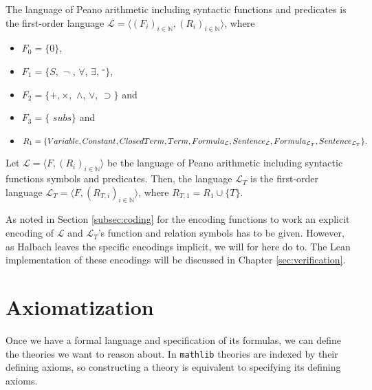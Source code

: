 \begin{definition}\label{def:l}
    The language of Peano arithmetic including syntactic functions and predicates is the first-order language $\mathcal{L} = \langle (F_i)_{i \in \mathbb{N}}, (R_i)_{i \in \mathbb{N}} \rangle$, where
    \begin{itemize}
        \item $F_0 = \{0\}$,
        \item $F_1 = \{S,$ \d{$\neg$} , \d{$\forall$}, \d{$\exists$}, ${^\circ}\}$,
        \item $F_2 = \{+,\times,$ \d{$\wedge$}, \d{$\vee$}, \d{$\supset$}$\}$ and
        \item $F_3 = \{$ \d{$subs$}$\}$ and
        \item $R_1 = \{Variable, Constant, ClosedTerm, Term, Formula_{\mathcal{L}}, Sentence_{\mathcal{L}}, \\ Formula_{\mathcal{L}_T}, Sentence_{\mathcal{L}_T}\}.$
    \end{itemize}
\end{definition} 

\begin{definition}\label{def:lt}
    Let $\mathcal{L} = \langle F, (R_i)_{i \in \mathbb{N}} \rangle$ be the language of Peano arithmetic including syntactic functions symbols and predicates. Then, the language $\mathcal{L}_T$ is the first-order language $\mathcal{L}_T = \langle F, (R_{T,i})_{i \in \mathbb{N}} \rangle$, where $R_{T,1} = R_1 \cup \{T\}$.
\end{definition}

As noted in Section \ref{subsec:coding} for the encoding functions to work an explicit encoding of $\mathcal{L}$ and $\mathcal{L}_T$'s function and relation symbols has to be given. However, as Halbach leaves the specific encodings implicit, we will for here do to. The Lean implementation of these encodings will be discussed in Chapter \ref{sec:verification}.

\section{Axiomatization}\label{subsec:axiomatization}
Once we have a formal language and specification of its formulas, we can define the theories we want to reason about. In \texttt{mathlib} theories are indexed by their defining axioms, so constructing a theory is equivalent to specifying its defining axioms. 

